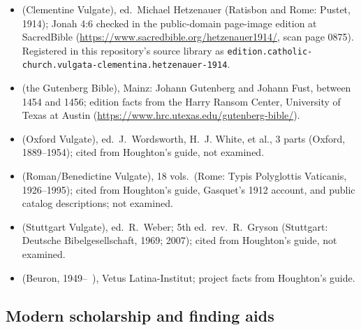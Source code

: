 \begin{itemize}
\item {} (Clementine Vulgate),
ed.\ Michael Hetzenauer (Ratisbon and Rome: Pustet, 1914); Jonah 4:6
checked in the public-domain page-image edition at SacredBible
(\url{https://www.sacredbible.org/hetzenauer1914/}, scan page 0875).
Registered in this repository's source library as
\texttt{edition.catholic-church.vulgata-clementina.hetzenauer-1914}.
\item {} (the Gutenberg Bible), Mainz: Johann
Gutenberg and Johann Fust, between 1454 and 1456; edition facts from the
Harry Ransom Center, University of Texas at Austin
(\url{https://www.hrc.utexas.edu/gutenberg-bible/}).
\item {} (Oxford Vulgate), ed.\ J.~Wordsworth,
H.~J. White, et al., 3 parts (Oxford, 1889--1954); cited from Houghton's
guide, not examined.
\item {} (Roman/Benedictine Vulgate), 18 vols.\ (Rome: Typis Polyglottis
Vaticanis, 1926--1995); cited from Houghton's guide, Gasquet's 1912
account, and public catalog descriptions; not examined.
\item {} (Stuttgart Vulgate),
ed.\ R.~Weber; 5th ed.\ rev.\ R.~Gryson (Stuttgart: Deutsche
Bibelgesellschaft, 1969; 2007); cited from Houghton's guide, not
examined.
\item {}
(Beuron, 1949--~), Vetus Latina-Institut; project facts from Houghton's
guide.
\end{itemize}

\subsection*{Modern scholarship and finding aids}

